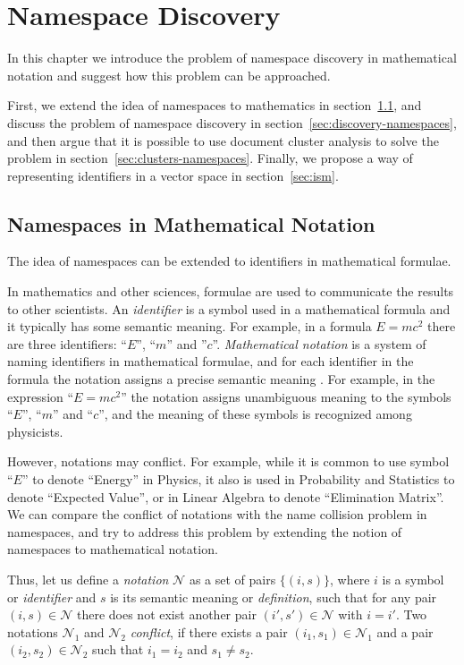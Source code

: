 \section{Namespace Discovery} \label{sec:namespace-discovery-chap}

In this chapter we introduce the problem of namespace discovery in 
mathematical notation and suggest how this problem can be approached. 

First, we extend the idea of namespaces to mathematics in section~\ref{sec:math-namespaces},
and discuss the problem of namespace discovery in section~\ref{sec:discovery-namespaces},
and then argue that it is possible to use document cluster analysis 
to solve the problem in section~\ref{sec:clusters-namespaces}. 
Finally, we propose a way of representing identifiers in a vector space 
in section~\ref{sec:ism}.


\subsection{Namespaces in Mathematical Notation} \label{sec:math-namespaces}

The idea of namespaces can be extended to identifiers in mathematical
formulae. 

In mathematics and other sciences, formulae are used to communicate the results 
to other scientists. An \emph{identifier} is a symbol used in a mathematical 
formula and it typically has some semantic meaning. For example, in a formula 
$E = m c^2$ there are three identifiers: ``$E$'', ``$m$'' and ''$c$''.
\emph{Mathematical notation} is a system of naming identifiers in
mathematical formulae, and for each identifier in the formula the notation assigns
a precise semantic meaning \cite{wikinotation}. For example, in the expression
``$E = mc^2$'' the notation assigns
unambiguous meaning to the symbols ``$E$'', ``$m$'' and ``$c$'', and the
meaning of these symbols is recognized among physicists.

However, notations may conflict. For example, while it is common to use
symbol ``$E$'' to denote ``Energy'' in Physics, it also is used in Probability and
Statistics to denote ``Expected Value'', or in Linear Algebra to denote
``Elimination Matrix''.
We can compare the conflict of notations with the name collision problem
in namespaces, and try to address this problem by extending the notion of
namespaces to mathematical notation.

Thus, let us define a \emph{notation} $\mathcal N$ as a set of pairs $\{ (i, s) \}$,
where $i$ is a symbol or \emph{identifier} and $s$ is its semantic meaning
or \emph{definition}, such that for any pair $(i, s) \in \mathcal N$ there
does not exist another pair $(i', s') \in \mathcal N$ with $i = i'$.
Two notations $\mathcal N_1$ and $\mathcal N_2$
\emph{conflict}, if there exists a pair $(i_1, s_1) \in \mathcal N_1$ and a pair
$(i_2, s_2) \in \mathcal N_2$ such that $i_1 = i_2$ and $s_1 \ne s_2$.


